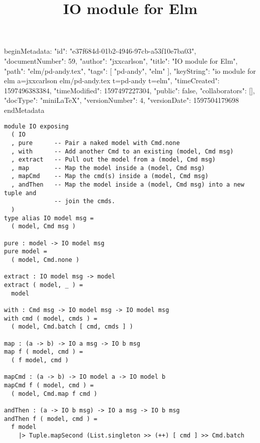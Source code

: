 beginMetadata:
{
    "id": "e37f684d-01b2-4946-97cb-a53f10e7ba03",
    "documentNumber": 59,
    "author": "jxxcarlson",
    "title": "IO module for Elm",
    "path": "elm/pd-andy.tex",
    "tags": [
        "pd-andy",
        "elm"
    ],
    "keyString": "io module for elm a=jxxcarlson elm/pd-andy.tex t=pd-andy t=elm",
    "timeCreated": 1597496383384,
    "timeModified": 1597497227304,
    "public": false,
    "collaborators": [],
    "docType": "miniLaTeX",
    "versionNumber": 4,
    "versionDate": 1597504179698
}
endMetadata\title{IO module for Elm}

\maketitle 


\begin{verbatim}
module IO exposing
  ( IO
  , pure      -- Pair a naked model with Cmd.none
  , with      -- Add another Cmd to an existing (model, Cmd msg)
  , extract   -- Pull out the model from a (model, Cmd msg)
  , map       -- Map the model inside a (model, Cmd msg)
  , mapCmd    -- Map the cmd(s) inside a (model, Cmd msg)
  , andThen   -- Map the model inside a (model, Cmd msg) into a new tuple and
              -- join the cmds.
  )
type alias IO model msg =
  ( model, Cmd msg )

pure : model -> IO model msg
pure model =
  ( model, Cmd.none )

extract : IO model msg -> model
extract ( model, _ ) =
  model

with : Cmd msg -> IO model msg -> IO model msg
with cmd ( model, cmds ) =
  ( model, Cmd.batch [ cmd, cmds ] )

map : (a -> b) -> IO a msg -> IO b msg
map f ( model, cmd ) =
  ( f model, cmd )

mapCmd : (a -> b) -> IO model a -> IO model b
mapCmd f ( model, cmd ) =
  ( model, Cmd.map f cmd )

andThen : (a -> IO b msg) -> IO a msg -> IO b msg
andThen f ( model, cmd ) =
  f model
    |> Tuple.mapSecond (List.singleton >> (++) [ cmd ] >> Cmd.batch

\end{verbatim}